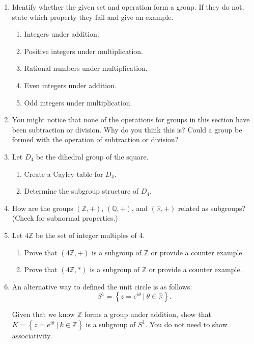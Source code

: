 \documentclass[
]{book}
\providecommand{\tightlist}{%
  \setlength{\itemsep}{0pt}\setlength{\parskip}{0pt}}
\theoremstyle{definition}
\theoremstyle{definition}
\theoremstyle{definition}
\theoremstyle{definition}
\theoremstyle{remark}
\begin{document}
\begin{enumerate}
\def\labelenumi{\arabic{enumi}.}
\item
  Identify whether the given set and operation form a group. If they do not, state which property they fail and give an example.

  \begin{enumerate}
  \def\labelenumii{\alph{enumii}.}
  \tightlist
  \item
    Integers under addition.
  \item
    Positive integers under multiplication.
  \item
    Rational numbers under multiplication.
  \item
    Even integers under addition.
  \item
    Odd integers under multiplication.
  \end{enumerate}
\item
  You might notice that none of the operations for groups in this section have been subtraction or division. Why do you think this is? Could a group be formed with the operation of subtraction or division?
\item
  Let \(D_4\) be the dihedral group of the square.

  \begin{enumerate}
  \def\labelenumii{\alph{enumii}.}
  \tightlist
  \item
    Create a Cayley table for \(D_4\).
  \item
    Determine the subgroup structure of \(D_4\).
  \end{enumerate}
\item
  How are the groups \((\mathbb{Z},+)\), \((\mathbb{Q},+)\), and \((\mathbb{R},+)\) related as subgroups? (Check for subnormal properties.)
\item
  Let \(4\mathbb{Z}\) be the set of integer multiples of 4.

  \begin{enumerate}
  \def\labelenumii{\alph{enumii}.}
  \tightlist
  \item
    Prove that \((4\mathbb{Z},+)\) is a subgroup of \(\mathbb{Z}\) or provide a counter example.
  \item
    Prove that \((4\mathbb{Z},*)\) is a subgroup of \(\mathbb{Z}\) or provide a counter example.
  \end{enumerate}
\item
  An alternative way to defined the unit circle is as follows: \[S^1 = \left\{ z=e^{i\theta} \: \vert \: \theta \in \mathbb{R} \right\}.\]

  Given that we know \(\mathbb{Z}\) forms a group under addition, show that \(K = \left\{ z=e^{i\theta}\:\vert \: k \in \mathbb{Z} \right\}\) is a subgroup of \(S^1\). You do not need to show associativity.
\end{enumerate}
\end{document}
